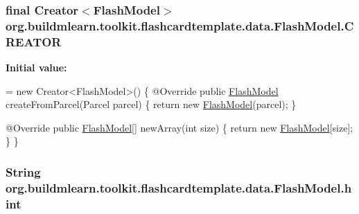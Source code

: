 \subsubsection[{\texorpdfstring{C\+R\+E\+A\+T\+OR}{CREATOR}}]{\setlength{\rightskip}{0pt plus 5cm}final Creator$<${\bf Flash\+Model}$>$ org.\+buildmlearn.\+toolkit.\+flashcardtemplate.\+data.\+Flash\+Model.\+C\+R\+E\+A\+T\+OR\hspace{0.3cm}{\ttfamily [static]}}\hypertarget{classorg_1_1buildmlearn_1_1toolkit_1_1flashcardtemplate_1_1data_1_1FlashModel_afd4b62c200855dfb7c24f6dbfb418602}{}\label{classorg_1_1buildmlearn_1_1toolkit_1_1flashcardtemplate_1_1data_1_1FlashModel_afd4b62c200855dfb7c24f6dbfb418602}
{\bfseries Initial value\+:}
\begin{DoxyCode}
= \textcolor{keyword}{new} Creator<FlashModel>() \{
        @Override
        \textcolor{keyword}{public} \hyperlink{classorg_1_1buildmlearn_1_1toolkit_1_1flashcardtemplate_1_1data_1_1FlashModel_af1c27a172c9efd778e8d8c64c78f105b}{FlashModel} createFromParcel(Parcel parcel) \{
            \textcolor{keywordflow}{return} \textcolor{keyword}{new} \hyperlink{classorg_1_1buildmlearn_1_1toolkit_1_1flashcardtemplate_1_1data_1_1FlashModel_af1c27a172c9efd778e8d8c64c78f105b}{FlashModel}(parcel);
        \}

        @Override
        \textcolor{keyword}{public} \hyperlink{classorg_1_1buildmlearn_1_1toolkit_1_1flashcardtemplate_1_1data_1_1FlashModel_af1c27a172c9efd778e8d8c64c78f105b}{FlashModel}[] newArray(\textcolor{keywordtype}{int} size) \{
            \textcolor{keywordflow}{return} \textcolor{keyword}{new} \hyperlink{classorg_1_1buildmlearn_1_1toolkit_1_1flashcardtemplate_1_1data_1_1FlashModel_af1c27a172c9efd778e8d8c64c78f105b}{FlashModel}[size];
        \}
    \}
\end{DoxyCode}
\subsubsection[{\texorpdfstring{hint}{hint}}]{\setlength{\rightskip}{0pt plus 5cm}String org.\+buildmlearn.\+toolkit.\+flashcardtemplate.\+data.\+Flash\+Model.\+hint\hspace{0.3cm}{\ttfamily [private]}}\hypertarget{classorg_1_1buildmlearn_1_1toolkit_1_1flashcardtemplate_1_1data_1_1FlashModel_aef87096d3d6ab0b6cdc78728f24ac64c}{}\label{classorg_1_1buildmlearn_1_1toolkit_1_1flashcardtemplate_1_1data_1_1FlashModel_aef87096d3d6ab0b6cdc78728f24ac64c}
